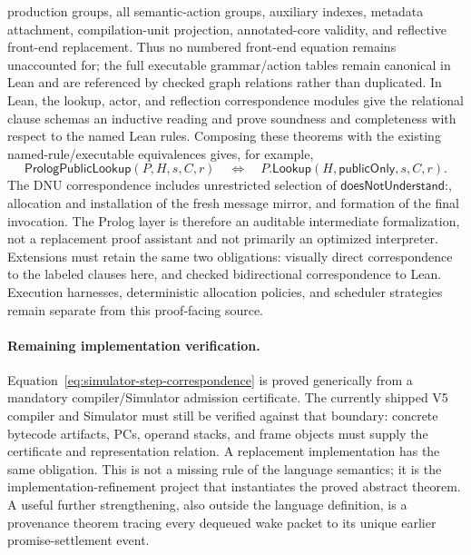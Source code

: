 \documentclass[11pt]{article}
\numberwithin{equation}{section}
\newcommand{\kws}[1]{\ensuremath{\mathsf{#1\mathord{:}}}}
\newcommand{\dnu}{\kws{doesNotUnderstand}}
\begin{document}
production groups, all semantic-action groups, auxiliary indexes, metadata
attachment, compilation-unit projection, annotated-core validity, and
reflective front-end replacement.  Thus no numbered front-end equation remains
unaccounted for; the full executable grammar/action tables remain canonical in
Lean and are referenced by checked graph relations rather than duplicated.
In Lean, the lookup, actor, and reflection correspondence modules give the
relational clause schemas an inductive reading and prove soundness and
completeness with respect to the named Lean rules.  Composing these theorems
with the existing named-rule/executable equivalences gives, for example,
\[
 \mathsf{PrologPublicLookup}(P,H,s,C,r)
 \quad\Longleftrightarrow\quad
 P.\mathsf{Lookup}(H,\mathsf{publicOnly},s,C,r).
\]
The DNU correspondence includes unrestricted selection of
\dnu, allocation and installation of the fresh message mirror, and formation
of the final invocation.  The Prolog layer is therefore an auditable
intermediate formalization, not a replacement proof assistant and not
primarily an optimized interpreter.  Extensions must retain the same two
obligations: visually direct correspondence to the labeled clauses here, and checked bidirectional
correspondence to Lean.  Execution harnesses, deterministic allocation
policies, and scheduler strategies remain separate from this proof-facing
source.

\paragraph{Remaining implementation verification.}\leavevmode\par
Equation~\eqref{eq:simulator-step-correspondence} is proved generically from a
mandatory compiler/Simulator admission certificate.  The currently shipped
V5 compiler and Simulator must still be verified against that boundary:
concrete bytecode artifacts, PCs, operand stacks, and frame objects must supply
the certificate and representation relation.  A replacement implementation
has the same obligation.  This is not a missing rule of the language
semantics; it is the implementation-refinement project that instantiates the
proved abstract theorem.  A useful further strengthening, also outside the
language definition, is a provenance theorem tracing every dequeued wake
packet to its unique earlier promise-settlement event.



\end{document}

